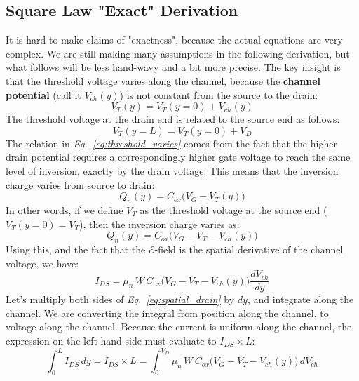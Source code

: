 \subsection{Square Law "Exact" Derivation}
It is hard to make claims of "exactness", because the actual equations are very complex.  We are still making many assumptions in the following derivation, but what follows will be less hand-wavy and a bit more precise.  The key insight is that the threshold voltage varies along the channel, because the \textbf{channel potential} (call it $V_{ch}(y)$) is not constant from the source to the drain:
    \begin{equation} 
        V_T(y) = V_T(y=0) + V_{ch}(y)
    \end{equation}
The threshold voltage at the drain end is related to the source end as follows:
    \begin{equation} 
        V_T(y=L) = V_T(y=0) + V_D
        \label{eq:threshold_varies}
    \end{equation} 
The relation in \emph{Eq.~\ref{eq:threshold_varies}} comes from the fact that the higher drain potential requires a correspondingly higher gate voltage to reach the same level of inversion, exactly by the drain voltage.  This means that the inversion charge varies from source to drain:
    \begin{equation} 
        Q_n(y) = C_{ox}\big(V_G - V_T(y)\big)
    \end{equation}
In other words, if we define $V_T$ as the threshold voltage at the source end ($V_T(y=0) = V_{T}$), then the inversion charge varies as:
    \begin{equation} 
        Q_n(y) = C_{ox}\big(V_G - V_T - V_{ch}(y)\big)
        \label{eq:invcharge}
    \end{equation}
Using this, and the fact that the $\mathcal{E}$-field is the spatial derivative of the channel voltage, we have:
    \begin{equation} 
        I_{DS} = \mu_n\,W\,C_{ox}\big(V_G - V_T - V_{ch}(y)\big)\frac{dV_{ch}}{dy}
        \label{eq:spatial_drain}
    \end{equation}
Let's multiply both sides of \emph{Eq.~\ref{eq:spatial_drain}} by $dy$, and integrate along the channel.  We are converting the integral from position along the channel, to voltage along the channel.  Because the current is uniform along the channel, the expression on the left-hand side must evaluate to $I_{DS} \times L$:
    \begin{equation} 
        \int_0^L I_{DS}\,dy = I_{DS} \times L
        = \int_0^{V_D} \mu_n\,W\,C_{ox}\big(V_G - V_T - V_{ch}(y)\big)\,dV_{ch} 
    \end{equation}
